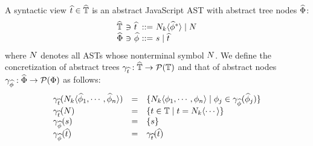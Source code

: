 \documentclass[10pt,conference]{IEEEtran}
\begin{document}
A syntactic view $\widehat{t} \in \widehat{\mathbb{T}}$ is an abstract JavaScript AST with
abstract tree nodes $\widehat{\Phi}$:
\[
  \begin{array}{l@{~}c@{~}l@{~}c@{~}l}
    \atreeset &\ni& \atree &::=& \nt_k \langle \anode^* \rangle \mid \nt\\
    \anodeset &\ni& \anode &::=& \str \mid \atree\\
  \end{array}
\]
where $N$ denotes all ASTs whose nonterminal symbol $N$. We define the
concretization of abstract trees $\gamma_{\widehat{t}}: \widehat{\mathbb{T}} \rightarrow
\mathcal{P}(\mathbb{T})$ and that of abstract nodes $\gamma_{\widehat{\phi}}: \widehat{\Phi}
\rightarrow \mathcal{P}(\Phi)$ as follows:
\[
  \begin{array}{lcl}
    \gamma_{\widehat{t}}(N_k \langle \widehat{\phi}_1, \cdots, \widehat{\phi}_n \rangle) &=&
    \{ N_k \langle \phi_1, \cdots, \phi_n \rangle \mid \phi_j \in
    \gamma_{\widehat{\phi}}(\widehat{\phi}_j) \}\\

    \gamma_{\widehat{t}}(N) &=&
    \{ t \in \mathbb{T} \mid t = N_k \langle \cdots \rangle \}\\

    \gamma_{\widehat{\phi}}(s) &=& \{ s \}\\

    \gamma_{\widehat{\phi}}(\widehat{t}) &=& \gamma_{\widehat{t}}(\widehat{t})\\
  \end{array}
\]
% 
% 
% 
% 
% 
\end{document}
